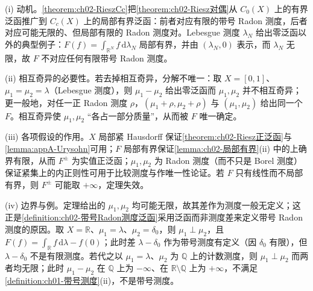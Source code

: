 \documentclass[../../main.tex]{subfiles}%
\begin{document}
\begin{remark}\label{remark:ch02-RieszCc唯一}
(i) 动机。\cref{theorem:ch02-RieszCc}把\cref{theorem:ch02-Riesz对偶}从 $C_0(X)$ 上的有界泛函推广到 $C_c(X)$ 上的局部有界泛函：前者对应有限的带号 Radon 测度，后者对应可能无限的、但局部有限的 Radon 测度对。Lebesgue 测度 $\lambda_N$ 给出零泛函以外的典型例子：$F(f)=\int_{\mathbb R^N}f\,\mathrm{d}\lambda_N$ 局部有界，并由 $(\lambda_N,0)$ 表示，而 $\lambda_N$ 无限，故 $F$ 不对应任何有限带号 Radon 测度。

(ii) 相互奇异的必要性。若去掉相互奇异，分解不唯一：取 $X=[0,1]$、$\mu_1=\mu_2=\lambda$（Lebesgue 测度），则 $\mu_1-\mu_2$ 给出零泛函而 $\mu_1,\mu_2$ 并不相互奇异；更一般地，对任一正 Radon 测度 $\rho$，$(\mu_1+\rho,\mu_2+\rho)$ 与 $(\mu_1,\mu_2)$ 给出同一个 $F$。相互奇异使 $\mu_1,\mu_2$ “各占一部分质量”，从而被 $F$ 唯一确定。

(iii) 各项假设的作用。$X$ 局部紧 Hausdorff 保证\cref{theorem:ch02-Riesz正泛函}与\cref{lemma:appA-Urysohn}可用；$F$ 局部有界保证\cref{lemma:ch02-局部有界}(ii) 中的上确界有限，从而 $F^\pm$ 为实值正泛函；$\mu_1,\mu_2$ 为 Radon 测度（而不只是 Borel 测度）保证紧集上的内正则性可用于比较测度与作唯一性论证。若 $F$ 只有线性而不局部有界，则 $F^\pm$ 可能取 $+\infty$，定理失效。

(iv) 边界与例。定理给出的 $\mu_1,\mu_2$ 均可能无限，故其差作为测度一般无定义；这正是\cref{definition:ch02-带号Radon测度泛函}采用泛函而非测度差来定义带号 Radon 测度的原因。取 $X=\mathbb R$、$\mu_1=\lambda$、$\mu_2=\delta_0$，则 $\mu_1\perp\mu_2$，且 $F(f)=\int_{\mathbb R}f\,\mathrm{d}\lambda-f(0)$；此时差 $\lambda-\delta_0$ 作为带号测度有定义（因 $\delta_0$ 有限），但 $\lambda-\delta_0$ 不是有限测度。若代之以 $\mu_1=\lambda$、$\mu_2$ 为 $\mathbb Q$ 上的计数测度，则 $\mu_1\perp\mu_2$ 而两者均无限；此时 $\mu_1-\mu_2$ 在 $\mathbb Q$ 上为 $-\infty$、在 $\mathbb R\setminus\mathbb Q$ 上为 $+\infty$，不满足\cref{definition:ch01-带号测度}(ii)，不是带号测度。
\end{remark}
\end{document}
